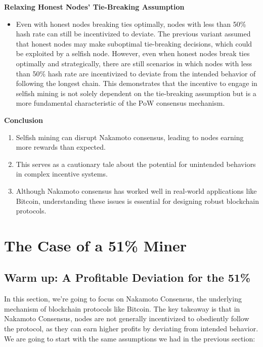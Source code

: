   \textbf{Relaxing Honest Nodes' Tie-Breaking Assumption}
  \begin{itemize}
    \item Even with honest nodes breaking ties optimally, nodes with less than 50\% hash rate can still be incentivized to deviate.
    The previous variant assumed that honest nodes may make suboptimal tie-breaking decisions, which could be exploited by a selfish node. However, even when honest nodes break ties optimally and strategically, there are still scenarios in which nodes with less than 50\% hash rate are incentivized to deviate from the intended behavior of following the longest chain. This demonstrates that the incentive to engage in selfish mining is not solely dependent on the tie-breaking assumption but is a more fundamental characteristic of the PoW consensus mechanism.
  \end{itemize}
  
  \noindent
  \textbf{Conclusion}
  \begin{enumerate}
    \item Selfish mining can disrupt Nakamoto consensus, leading to nodes earning more rewards than expected.
    \item This serves as a cautionary tale about the potential for unintended behaviors in complex incentive systems.
    \item Although Nakamoto consensus has worked well in real-world applications like Bitcoin, understanding these issues is essential for designing robust blockchain protocols.
  \end{enumerate}
  
  
  \section{The Case of a 51\% Miner}
  \subsection{Warm up: A Profitable Deviation for the 51\%}
  In this section, we're going to focus on Nakamoto Consensus, the underlying mechanism of blockchain protocols like Bitcoin. The key takeaway is that in Nakamoto Consensus, nodes are not generally incentivized to obediently follow the protocol, as they can earn higher profits by deviating from intended behavior.\\
  We are going to start with the same assumptions we had in the previous section:\\
  
